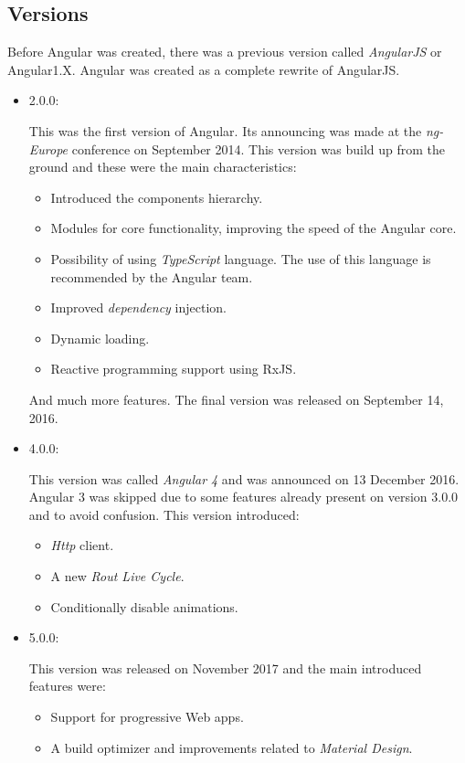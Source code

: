 \documentclass[a4paper, 12pt, english]{book}
\begin{document}
\subsection{Versions}
\label{sec:angular-versions}
Before Angular was created, there was a previous version called \textit{AngularJS} or Angular1.X. Angular was created as a complete rewrite of AngularJS.

\begin{itemize}
    \item 2.0.0:

        This was the first version of Angular. Its announcing was made at the \textit{ng-Europe} conference on September 2014. This version was build up from the ground and these were the main characteristics:
        \begin{itemize}
            \item Introduced the components hierarchy.
            \item Modules for core functionality, improving the speed of the Angular core.
            \item Possibility of using \textit{TypeScript} language. The use of this language is recommended by the Angular team.
            \item Improved \textit{dependency} injection.
            \item Dynamic loading.
            \item Reactive programming support using RxJS.
        \end{itemize}
        And much more features. The final version was released on September 14, 2016.
    \item 4.0.0:

        This version was called \textit{Angular 4} and was announced on 13 December 2016. Angular 3 was skipped due to some features already present on version 3.0.0 and to avoid confusion. This version introduced:
        \begin{itemize}
            \item \textit{Http} client.
            \item A new \textit{Rout Live Cycle}.
            \item Conditionally disable animations.
        \end{itemize}
    \item 5.0.0:

        This version was released on November 2017 and the main introduced features were:
        \begin{itemize}
            \item Support for progressive Web apps.
            \item A build optimizer and improvements related to \textit{Material Design}.
        \end{itemize}
\end{itemize}
\end{document}
